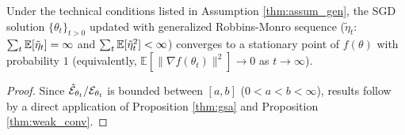 \documentclass{article}
\theoremstyle{plain}
\theoremstyle{definition}
\theoremstyle{remark}
\newcommand{\UBA}{\texttt{UBA}}
\newcommand{\FLO}{\texttt{FLO}}
\begin{document}
		
		\begin{prop}
			\label{thm:weak_conv}
			Under the technical conditions listed in Assumption \ref{thm:assum_gen}, the SGD solution $\{ \theta_t \}_{t>0}$ updated with generalized Robbins-Monro sequence ($\tilde{\eta}_t$: $\sum_t \mathbb{E}[\tilde{\eta}_t] = \infty$ and $\sum_t \mathbb{E}[\tilde{\eta}_t^2] < \infty$) converges to a stationary point of $f(\theta)$ with probability $1$ (equivalently, $\mathbb{E}\left[\|\nabla f(\theta_t)\|^2\right]\rightarrow 0$ as $t\rightarrow \infty$).
		\end{prop}
		
		\begin{proof}
			Since $\hat{\mathcal{E}}_{\theta_t}/\mathcal{E}_{\theta_t}$ is bounded between $[a,b]$ ($0<a<b<\infty$), results follow by a direct application of Proposition \ref{thm:gsa} and Proposition \ref{thm:weak_conv}. 
		\end{proof}
		
		
			
		
\end{document}
